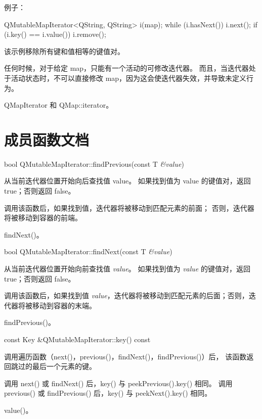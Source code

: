 例子：

\begin{cppcode}
QMutableMapIterator<QString, QString> i(map);
while (i.hasNext()) {
    i.next();
    if (i.key() == i.value())
        i.remove();
}
\end{cppcode}


该示例移除所有键和值相等的键值对。

任何时候，对于给定 map，只能有一个活动的可修改迭代器。
而且，当迭代器处于活动状态时，不可以直接修改 map，因为这会使迭代器失效，并导致未定义行为。

\begin{seeAlso}
QMapIterator 和 QMap::iterator。
\end{seeAlso}

\section{成员函数文档}

bool QMutableMapIterator::findPrevious(const T \emph{\&value})

从当前迭代器位置开始向后查找值 value。
如果找到值为 value 的键值对，返回 true；否则返回 false。

调用该函数后，如果找到值，迭代器将被移动到匹配元素的前面；
否则，迭代器将被移动到容器的前端。

\begin{seeAlso}
findNext()。
\end{seeAlso}

bool QMutableMapIterator::findNext(const T \emph{\&value})

从当前迭代器位置开始向前查找值 \emph{value}。
如果找到值为 \emph{value} 的键值对，返回 true；否则返回 false。

调用该函数后，如果找到值 \emph{value}，迭代器将被移动到匹配元素的后面；否则，迭代器将被移动到容器的末端。

\begin{seeAlso}
findPrevious()。
\end{seeAlso}

const Key \&QMutableMapIterator::key() const

调用遍历函数（next()，previous()，findNext()，findPrevious()）后，
该函数返回跳过的最后一个元素的键。

调用 next() 或 findNext() 后，key() 与 peekPrevious().key() 相同。
调用 previous() 或 findPrevious() 后，key() 与 peekNext().key() 相同。

\begin{seeAlso}
value()。
\end{seeAlso}

